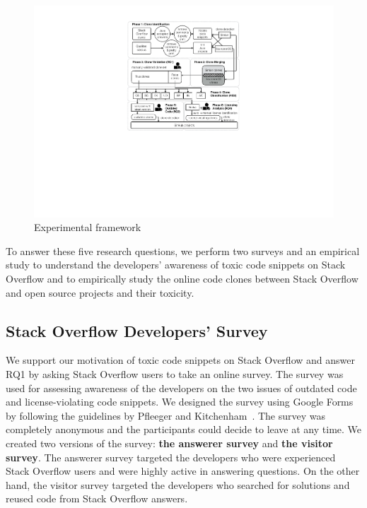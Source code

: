 \documentclass[10pt,journal,compsoc]{IEEEtran}
\begin{document}
\begin{figure}
	\centering
	\includegraphics[width=\linewidth]{exp_framework_new}
	\caption{Experimental framework}
	\label{fig:exp_framework}
\end{figure}

To answer these five research questions, we perform two surveys and an empirical study to
understand the developers' awareness of toxic code snippets on Stack Overflow and to
empirically study the online code clones between Stack Overflow and open source
projects and their toxicity. 

\subsection{Stack Overflow Developers' Survey} We support our motivation of
toxic code snippets on Stack Overflow and answer RQ1 by asking Stack
Overflow users to take an online survey. The survey was used for assessing awareness of
the developers on the two issues of outdated code and license-violating code
snippets. We designed the survey using Google Forms by following the guidelines by Pfleeger and
Kitchenham~\cite{Pfleeger2001,Kitchenham2002}. The survey was completely
anonymous and the participants could decide to leave at any time. 
We created two versions of the survey: \textbf{the answerer survey} and \textbf{the visitor survey}.
The answerer survey targeted the developers who were experienced Stack Overflow users
and were highly active in answering questions. On the other hand, the visitor survey
targeted the developers who searched for solutions and reused code from Stack Overflow answers.
\end{document}
